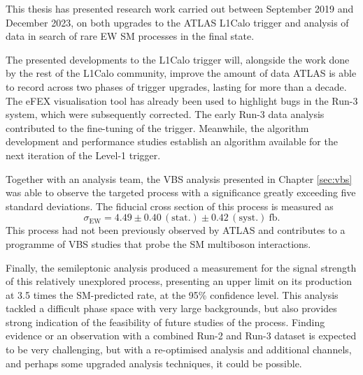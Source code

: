 This thesis has presented research work carried out between September 2019 and
December 2023, on both upgrades to the \ac{ATLAS} \ac{L1Calo} trigger and
analysis of data in search of rare \ac{EW} \ac{SM} processes in the \Zyjj final
state.

The presented developments to the \ac{L1Calo} trigger will, alongside the work
done by the rest of the \ac{L1Calo} community, improve the amount of data
\ac{ATLAS} is able to record across two phases of trigger upgrades, 
lasting for more than a decade. The \ac{eFEX} visualisation tool has already
been used to highlight bugs in the Run-3 system, which were subsequently
corrected. The early Run-3 data
analysis contributed to the fine-tuning of the \egamma trigger. Meanwhile, the
\eratio algorithm development and performance studies establish an algorithm
available for the next iteration of the Level-1 \egamma trigger.

Together with an analysis team, the \ac{VBS} \Zy analysis presented in Chapter
\ref{sec:vbs} was able to observe the targeted process with a significance
greatly exceeding five standard deviations. The fiducial cross section of this
process is measured as
\begin{equation*}
  \sigma_\text{EW} = 4.49 \pm 0.40 \, (\text{stat.}) \pm 0.42 \, (\text{syst.})
  ~\text{fb}.
\end{equation*}
This process had not been previously
observed by \ac{ATLAS} and contributes to a programme of \ac{VBS} studies that
probe the \ac{SM} multiboson interactions.

Finally, the semileptonic \VZy analysis produced a measurement for the signal
strength of this relatively unexplored process, presenting an upper limit on its
production at 3.5 times the \ac{SM}-predicted rate, at the 95\% confidence
level. This analysis tackled a difficult phase space with very large
backgrounds, but also provides strong indication of the feasibility of future
studies of the process. Finding evidence or an observation with a combined Run-2
and Run-3 dataset is expected to be very challenging, but with a re-optimised
analysis and additional channels, and perhaps some upgraded analysis techniques,
it could be possible.
